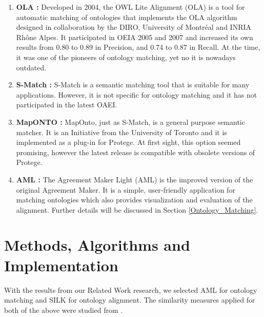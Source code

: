 \documentclass[runningheads,a4paper]{../../StyleFiles/llncs}
\begin{document}
\begin{enumerate}
	\item \textbf{OLA \cite{euzenat2004ontology}:} Developed in 2004, the OWL Lite Alignment (OLA) is a tool for automatic matching of ontologies that implements the OLA algorithm designed in collaboration by the DIRO, University of Montréal and INRIA Rhône Alpes. It participated in OEIA 2005 \cite{euzenat2005ola} and 2007 \cite{djoufak2007ola} and increased its own results from 0.80 to 0.89 in Precision, and 0.74 to 0.87 in Recall. At the time, it was one of the pioneers of ontology matching, yet no it is nowadays outdated.
	\item \textbf{S-Match \cite{giunchiglia2004s}:} S-Match is a semantic matching tool that is suitable for many applications. However, it is not specific for ontology matching and it has not participated in the latest OAEI.
	\item \textbf{MapONTO \cite{an2004refining}:} MapOnto, just as S-Match, is a general purpose semantic matcher. It is an Initiative from the University of Toronto and it is implemented as a plug-in for Protege. At first sight, this option seemed promising, however the latest release is compatible with obsolete versions of Protege. 
	\item \textbf{AML \cite{faria2013agreementmakerlight}:} The Agreement
	Maker Light (AML) is the improved version of the original Agreement Maker. It is a simple, user-friendly application for matching ontologies which also provides visualization and evaluation of the alignment. Further details will be discussed in Section \ref{Ontology_Matching}.
\end{enumerate}

\section{Methods, Algorithms and Implementation}
With the results from our Related Work research, we selected AML for ontology matching and SILK for ontology alignment. The similarity measures applied for both of the above were studied from \cite{sun2015comparative}.

\end{document}
